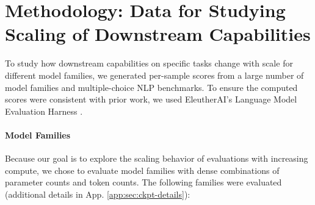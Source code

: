 \section{Methodology: Data for Studying Scaling of Downstream Capabilities}
\label{sec:methodology}

To study how downstream capabilities on specific tasks change with scale for different model families, we generated per-sample scores from a large number of model families and multiple-choice NLP benchmarks. To ensure the computed scores were consistent with prior work, we used EleutherAI's Language Model Evaluation Harness \citep{eleuther2023evalharness}.

\paragraph{Model Families} 

Because our goal is to explore the scaling behavior of evaluations with increasing compute, we chose to evaluate model families with dense combinations of parameter counts and token counts.  The following families were evaluated (additional details in App. \ref{app:sec:ckpt-details}):

